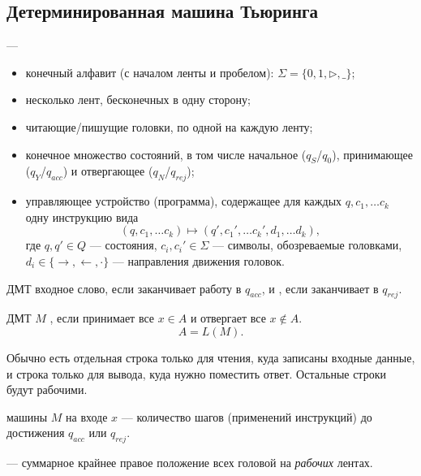 \subsection{Детерминированная машина Тьюринга}
\begin{defn}
	 ---
	\begin{itemize}[noitemsep]
		\item конечный алфавит (с началом ленты и пробелом): $ \Sigma  = \{0, 1, \triangleright, \_\}$;
		\item несколько лент, бесконечных в одну сторону;
		\item читающие/пишущие головки, по одной на каждую ленту;
		\item конечное множество состояний, в том числе начальное ($ q_S$/$q_0$), принимающее ($ q_Y $/$ q_{acc}$) и отвергающее ($ q_N$/$ q_{rej}$);
		\item управляющее устройство (программа), содержащее для каждых $ q, c_1, \ldots c_k$ одну инструкцию вида
			\[
				(q, c_1, \ldots c_k) \mapsto (q', c_1', \ldots c_k', d_1, \ldots d_k)
			,\] 
			где $ q, q' \in Q$ --- состояния, $ c_i, c_i' \in \Sigma $ --- символы, обозреваемые головками, $ d_i \in \{ \to , \leftarrow, \cdot  \}$ --- направления движения головок.
	\end{itemize}

	ДМТ  входное слово, если заканчивает работу в $ q_{acc}$, и , если заканчивает в $ q_{rej}$.

	ДМТ $ M$ , если принимает все $ x \in A$ и отвергает все $ x \not\in A$.
	\[
		A = L(M)
	.\] 
\end{defn}
\begin{note}
	Обычно есть отдельная строка только для чтения, куда записаны входные данные, и строка только для вывода, куда нужно поместить ответ. Остальные строки будут рабочими.
\end{note}

\begin{defn}
	  машины $ M$ на входе $ x$ --- количество шагов (применений инструкций) до достижения $ q_{acc}$ или $ q_{rej}$.

	\noindent
	 --- суммарное крайнее правое положение всех головой на \textit{рабочих} лентах.
\end{defn}

